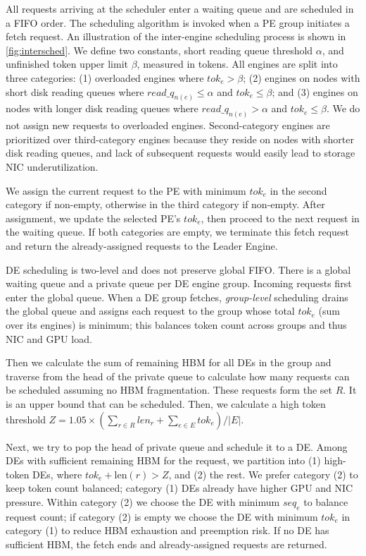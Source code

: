  All requests arriving at the scheduler enter a waiting queue and are scheduled in a FIFO order. The scheduling algorithm is invoked when a PE group initiates a fetch request.
An illustration of the inter-engine scheduling process is shown in \autoref{fig:intersched}.
We define two constants, short reading queue threshold $\alpha$, and unfinished token upper limit $\beta$, measured in tokens.
All engines are split into three categories:
(1) overloaded engines where $tok_e > \beta$;
(2) engines on nodes with short disk reading queues where $read\_q_{n(e)} \leq \alpha$ and $tok_e \leq \beta$; and
(3) engines on nodes with longer disk reading queues where $read\_q_{n(e)} > \alpha$ and $tok_e \leq \beta$.
We do not assign new requests to overloaded engines.
Second-category engines are prioritized over third-category engines because they reside on nodes with shorter disk reading queues, and lack of subsequent requests would easily lead to storage NIC underutilization.

We assign the current request to the PE with minimum $tok_e$ in the second category if non-empty, otherwise in the third category if non-empty.
After assignment, we update the selected PE's $tok_e$, then proceed to the next request in the waiting queue.
If both categories are empty, we terminate this fetch request and return the already-assigned requests to the Leader Engine.




DE scheduling is two-level and does not preserve global FIFO. There is a global waiting queue and a private queue per DE engine group. Incoming requests first enter the global queue. When a DE group fetches, \emph{group-level} scheduling drains the global queue and assigns each request to the group whose total $tok_e$ (sum over its engines) is minimum; this balances token count across groups and thus NIC and GPU load. 

Then we calculate the sum of remaining HBM for all DEs in the group and traverse from the head of the private queue to calculate how many requests can be scheduled assuming no HBM fragmentation. These requests form the set $R$.
It is an upper bound that can be scheduled. 
Then, we calculate a high token threshold $Z = 1.05 \times (\sum_{r\in R} {len_r} + \sum_{e\in E} {tok_e}) / |E|$.

Next, we try to pop the head of private queue and schedule it to a DE. 
Among DEs with sufficient remaining HBM for the request, we partition into (1) high-token DEs, where $tok_e + \text{len}(r) > Z$, and (2) the rest. We prefer category (2) to keep token count balanced; category (1) DEs already have higher GPU and NIC pressure. Within category (2) we choose the DE with minimum $seq_e$ to balance request count; if category (2) is empty we choose the DE with minimum $tok_e$ in category (1) to reduce HBM exhaustion and preemption risk. If no DE has sufficient HBM, the fetch ends and already-assigned requests are returned.


